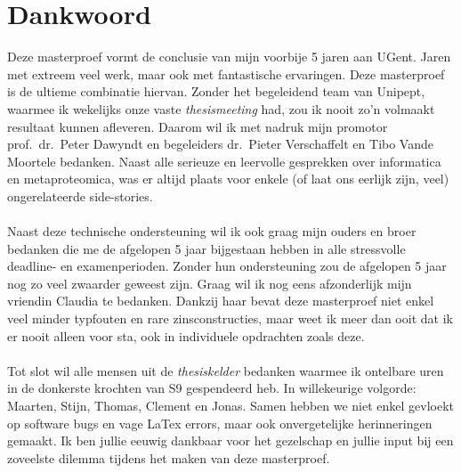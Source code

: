 \chapter{Dankwoord}\label{ch:dankwoord}
Deze masterproef vormt de conclusie van mijn voorbije 5 jaren aan UGent.
Jaren met extreem veel werk, maar ook met fantastische ervaringen.
Deze masterproef is de ultieme combinatie hiervan.
Zonder het begeleidend team van Unipept, waarmee ik wekelijks onze vaste \textit{thesismeeting} had, zou ik nooit zo'n volmaakt resultaat kunnen afleveren.
Daarom wil ik met nadruk mijn promotor prof.\ dr.\ Peter Dawyndt en begeleiders dr.\ Pieter Verschaffelt en Tibo Vande Moortele bedanken.
Naast alle serieuze en leervolle gesprekken over informatica en metaproteomica, was er altijd plaats voor enkele (of laat ons eerlijk zijn, veel) ongerelateerde side-stories.
\\ \\
Naast deze technische ondersteuning wil ik ook graag mijn ouders en broer bedanken die me de afgelopen 5 jaar bijgestaan hebben in alle stressvolle deadline- en examenperioden.
Zonder hun ondersteuning zou de afgelopen 5 jaar nog zo veel zwaarder geweest zijn.
Graag wil ik nog eens afzonderlijk mijn vriendin Claudia te bedanken.
Dankzij haar bevat deze masterproef niet enkel veel minder typfouten en rare zinsconstructies, maar weet ik meer dan ooit dat ik er nooit alleen voor sta, ook in individuele opdrachten zoals deze.
\\ \\
Tot slot wil alle mensen uit de \textit{thesiskelder} bedanken waarmee ik ontelbare uren in de donkerste krochten van S9 gespendeerd heb.
In willekeurige volgorde: Maarten, Stijn, Thomas, Clement en Jonas.
Samen hebben we niet enkel gevloekt op software bugs en vage LaTex errors, maar ook onvergetelijke herinneringen gemaakt.
Ik ben jullie eeuwig dankbaar voor het gezelschap en jullie input bij een zoveelste dilemma tijdens het maken van deze masterproef.
